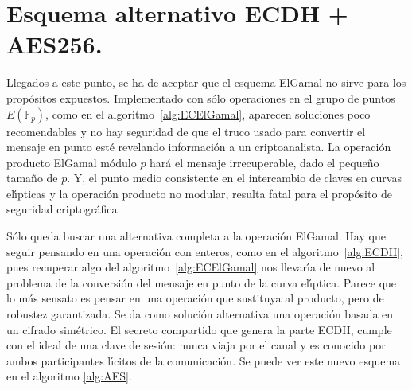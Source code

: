 \documentclass{cedi}%
\def\ce{curva{} el\'{\i}ptica}%
\def\ces{curvas{} el\'{\i}pticas}%
\def\cf{cuerpo finito}%
\newcommand{\EFp}{\ensuremath{E(\mathbb{F}_p)}}%
\theoremstyle{plain}        			%
\theoremstyle{definition}   			%
\theoremstyle{saltolinea}   			%
\begin{document}


\section{Esquema alternativo ECDH + AES256.}

Llegados a este punto, se ha de aceptar que el esquema ElGamal no sirve para los prop\'ositos expuestos. Implementado con s\'olo operaciones en el grupo de puntos $\EFp$, como en el algoritmo~\ref{alg:ECElGamal}, aparecen soluciones poco recomendables y no hay seguridad de que el truco usado para convertir el mensaje en punto est\'e revelando informaci\'on a un criptoanalista. La operaci\'on producto ElGamal m\'odulo $p$ har\'a el mensaje irrecuperable, dado el peque\~no tama\~no de $p$. Y, el punto medio consistente en el intercambio de claves en \ces{} y la operaci\'on producto no modular, resulta fatal para el prop\'osito de seguridad criptogr\'afica.

S\'olo queda buscar una alternativa completa a la operaci\'on ElGamal. Hay que seguir pensando en una operaci\'on con enteros, como en el algoritmo~\ref{alg:ECDH}, pues recuperar algo del algoritmo~\ref{alg:ECElGamal} nos llevar\'{\i}a de nuevo al problema de la conversi\'on del mensaje en punto de la \ce{}. Parece que lo m\'as sensato es pensar en una operaci\'on que sustituya al producto, pero de robustez garantizada. Se da como soluci\'on alternativa una operaci\'on basada en un cifrado sim\'etrico. El secreto compartido que genera la parte ECDH, cumple con el ideal de una clave de sesi\'on: nunca viaja por el canal y es conocido por ambos participantes l\'{\i}citos de la comunicaci\'on. Se puede ver este nuevo esquema en el algoritmo \ref{alg:AES}.
\end{document}
